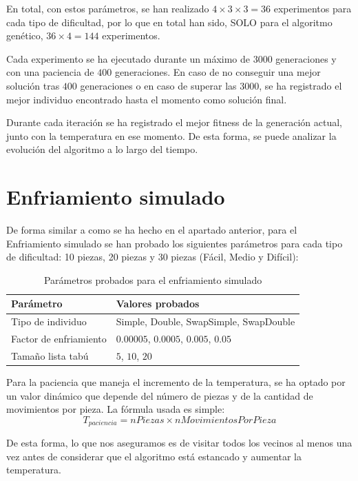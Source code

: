 \documentclass[11pt,spanish,listoffigures,listoftables]{tfgetsinf}
\begin{document}
En total, con estos parámetros, se han realizado $4 \times 3 \times 3 = 36$ experimentos para cada tipo de dificultad, por lo que en total han sido, SOLO para el algoritmo genético, $36 \times 4 = 144$ experimentos. 

Cada experimento se ha ejecutado durante un máximo de $3000$ generaciones y con una paciencia de $400$ generaciones. En caso de no conseguir una mejor solución tras $400$ generaciones o en caso de superar las $3000$, se ha registrado el mejor individuo encontrado hasta el momento como solución final.

Durante cada iteración se ha registrado el mejor fitness de la generación actual, junto con la temperatura en ese momento. De esta forma, se puede analizar la evolución del algoritmo a lo largo del tiempo.

\section{Enfriamiento simulado}
De forma similar a como se ha hecho en el apartado anterior, para el Enfriamiento simulado se han probado los siguientes parámetros para cada tipo de dificultad: 10 piezas, 20 piezas y 30 piezas (Fácil, Medio y Difícil):

\begin{table}[H]
    \centering
    \begin{tabular}{|l|l|}
        \hline
        \textbf{Parámetro} & \textbf{Valores probados} \\
        \hline
        Tipo de individuo & Simple, Double, SwapSimple, SwapDouble \\
        \hline
        Factor de enfriamiento & $0.00005$, $0.0005$, $0.005$, $0.05$ \\
        \hline
        Tamaño lista tabú & $5$, $10$, $20$ \\
        \hline
    \end{tabular}
    \caption{Parámetros probados para el enfriamiento simulado}
    \label{tab:parametros_sa}
\end{table}

Para la paciencia que maneja el incremento de la temperatura, se ha optado por un valor dinámico que depende del número de piezas y de la cantidad de movimientos por pieza. La fórmula usada es simple:
$$
T_{paciencia} = nPiezas \times nMovimientosPorPieza 
$$

De esta forma, lo que nos aseguramos es de visitar todos los vecinos al menos una vez antes de considerar que el algoritmo está estancado y aumentar la temperatura.
\end{document}
